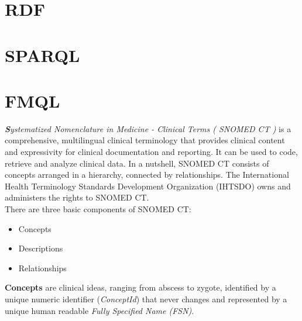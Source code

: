 \documentclass[DIV=calc, paper=a4, fontsize=12pt, onecolumn]{scrartcl}	 %
\newcommand{\initial}[1]{ %
\lettrine[lines=3,lhang=0.3,nindent=0em,slope=0em]{
\color{DarkBlue}
{\textbf{\textit{#1}}}}{}}
\begin{document}
\section[Resource Description Framework (RDF)]{RDF}
\section[SPARQL Protocol and RDF Query Language (SPARQL)]{SPARQL}
\section[FileMan Query Language ( FMQL )]{FMQL}

\initial{S}\textit{ystematized Nomenclature in Medicine - Clinical Terms ( SNOMED CT )} is a comprehensive, multilingual clinical terminology that provides clinical content and expressivity for clinical documentation and reporting. It can be used to code, retrieve and analyze clinical data. In a nutshell, SNOMED CT consists of concepts arranged in a hierarchy, connected by relationships. The International Health Terminology Standards Development Organization (IHTSDO) owns and administers the rights to SNOMED CT.\\

There are three basic components of SNOMED CT:
\begin{itemize}
	\item{Concepts}
	\item{Descriptions}
	\item{Relationships}
\end{itemize}

\textbf{Concepts} are clinical ideas, ranging from abscess to zygote, identified by a unique numeric identifier (\textit{ConceptId}) that never changes and represented by a unique human readable \textit{Fully Specified Name (FSN)}\cite{snomed_-_user_guide_snomed_2011,snomed_implementation_guide_snomed_2011}.




{}

\end{document}
